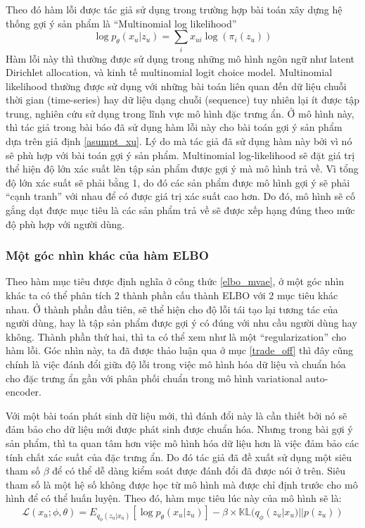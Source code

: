     Theo đó hàm lỗi được tác giả sử dụng trong trường hợp bài toán xây dựng hệ thống gợi ý sản phẩm là ``Multinomial log likelihood'' 
    \begin{equation}
        \log p_\theta(x_u|z_u) = \sum_i x_{ui}\log (\pi_i(z_u))
    \end{equation}
    Hàm lỗi này thì thường được sử dụng trong những mô hình ngôn ngữ như latent Dirichlet allocation, và kinh tế multinomial logit choice model. 
    Multinomial likelihood thường được sử dụng với những bài toán liên quan đến dữ liệu chuỗi thời gian (time-series) hay dữ liệu dạng chuỗi (sequence) tuy nhiên lại ít được tập trung, nghiên cứu sử dụng trong lĩnh vực mô hình đặc trưng ẩn. 
    Ở mô hình này, thì tác giả trong bài báo \cite{mvae} đã sử dụng hàm lỗi này cho bài toán gợi ý sản phẩm dựa trên giả định \ref{asumpt_xu}.
    Lý do mà tác giả đã sử dụng hàm này bởi vì nó sẽ phù hợp với bài toán gợi ý sản phẩm.
    Multinomial log-likelihood sẽ đặt giá trị thể hiện độ lớn xác suất lên tập sản phẩm được gợi ý mà mô hình trả về. 
    Vì tổng độ lớn xác suất sẽ phải bằng 1, do đó các sản phẩm được mô hình gợi ý sẽ phải ``cạnh tranh'' với nhau để có được giá trị xác suất cao hơn. 
    Do đó, mô hình sẽ cố gắng dạt được mục tiêu là các sản phẩm trả về sẽ được xếp hạng đúng theo mức độ phù hợp với người dùng. 
    
    \subsubsection{Một góc nhìn khác của hàm ELBO}
    \label{subsubsecELBO}
    Theo hàm mục tiêu được định nghĩa ở công thức \ref{elbo_mvae}, ở một góc nhìn khác ta có thể phân tích 2 thành phần cấu thành ELBO với 2 mục tiêu khác nhau.
    Ở thành phần đầu tiên, sẽ thể hiện cho độ lỗi tái tạo lại tương tác của người dùng, hay là tập sản phẩm được gợi ý có đúng với nhu cầu người dùng hay không. 
    Thành phần thứ hai, thì ta có thể xem như là một ``regularization'' cho hàm lỗi.
    Góc nhìn này, ta đã được thảo luận qua ở mục \ref{trade_off} thì đây cũng chính là việc đánh đổi giữa độ lỗi trong việc mô hình hóa dữ liệu và chuẩn hóa cho đặc trưng ẩn gần với phân phối chuẩn trong mô hình variational auto-encoder.

    Với một bài toán phát sinh dữ liệu mới, thì đánh đổi này là cần thiết bởi nó sẽ đảm bảo cho dữ liệu mới được phát sinh được chuẩn hóa.
    Nhưng trong bài gợi ý sản phẩm, thì ta quan tâm hơn việc mô hình hóa dữ liệu hơn là việc đảm bảo các tính chất xác suất của đặc trưng ẩn.
    Do đó tác giả đã đề xuất sử dụng một siêu tham số $\beta$ để có thể dễ dàng kiểm soát được đánh đổi đã được nói ở trên. 
    Siêu tham số là một hệ số không được học từ mô hình mà được chỉ định trước cho mô hình để có thể huấn luyện.
    Theo đó, hàm mục tiêu lúc này của mô hình sẽ là:
    \begin{equation}
        \label{elbo_betamvae}
        \mathcal{L}(x_u;\phi,\theta) = E_{q_\phi(z_u|x_u)}[\log p_\theta(x_u|z_u)] - \beta \times \mathbb{KL}(q_\phi(z_u|x_u) || p(z_u))
    \end{equation}

